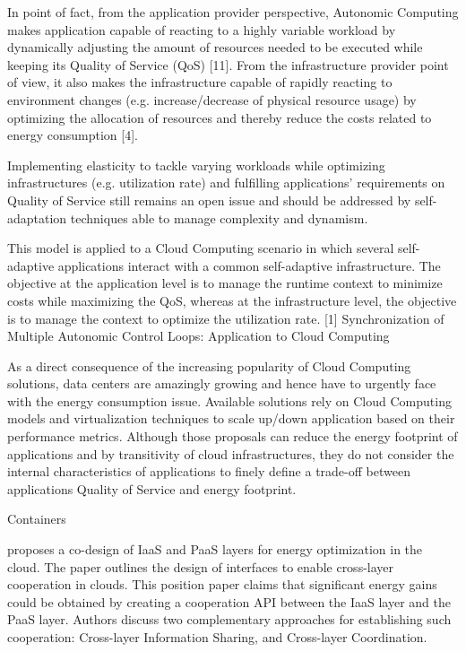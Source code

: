 In point of fact, from the application provider perspective, Autonomic Computing makes application capable of reacting to a highly variable workload by dynamically adjusting the amount of resources needed to be executed while keeping its Quality of Service (QoS) [11]. From the infrastructure provider point of view, it also makes the infrastructure capable of rapidly reacting to environment changes (e.g. increase/decrease of physical resource usage) by optimizing the allocation of resources and thereby reduce the costs related to energy consumption [4].

Implementing elasticity to tackle varying workloads while optimizing infrastructures (e.g. utilization rate) and fulfilling applications’ requirements on Quality of Service still remains an open issue and should be addressed by self-adaptation techniques able to manage complexity and dynamism. 

This model is applied to a Cloud Computing scenario in which several self-adaptive applications interact with a common self-adaptive infrastructure. The objective at the application level is to manage the runtime context to minimize costs while maximizing the QoS, whereas at the infrastructure level, the objective is to manage the context to optimize the utilization rate. 
[1] Synchronization of Multiple Autonomic Control Loops: Application to Cloud Computing

As a direct consequence of the increasing popularity of Cloud Computing solutions, data centers are amazingly growing
and hence have to urgently face with the energy consumption issue. Available solutions rely on Cloud Computing
models and virtualization techniques to scale up/down application based on their performance metrics. Although
those proposals can reduce the energy footprint of applications and by transitivity of cloud infrastructures, they
do not consider the internal characteristics of applications to finely define a trade-off between applications Quality of Service and energy footprint.

Containers

\cite{} proposes a co-design of IaaS and PaaS layers for energy optimization in the cloud. The paper outlines the design of interfaces to enable cross-layer cooperation in clouds. This position paper claims that significant energy gains could be obtained by creating a cooperation API between the IaaS layer and the PaaS layer. Authors discuss two complementary approaches for establishing such cooperation: Cross-layer Information Sharing, and Cross-layer Coordination.

